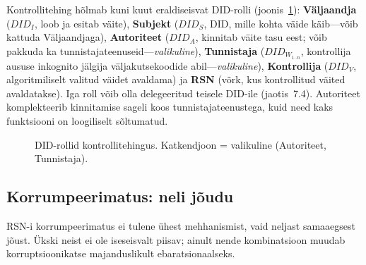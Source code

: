 \documentclass[11pt,a4paper,twocolumn]{article}
\begin{document}
Kontrollitehing hõlmab kuni kuut eraldiseisvat DID-rolli (joonis~\ref{fig:roles}): \textbf{Väljaandja} ($DID_I$, loob ja esitab väite), \textbf{Subjekt} ($DID_S$, DID, mille kohta väide käib---võib kattuda Väljaandjaga), \textbf{Autoriteet} ($DID_A$, kinnitab väite tasu eest; võib pakkuda ka tunnistajateenuseid---\emph{valikuline}), \textbf{Tunnistaja} ($DID_{W_{1..n}}$, kontrollija aususe inkognito jälgija väljakutsekoodide abil---\emph{valikuline}), \textbf{Kontrollija} ($DID_V$, algoritmiliselt valitud väidet avaldama) ja \textbf{RSN} (võrk, kus kontrollitud väited avaldatakse). Iga roll võib olla delegeeritud teisele DID-ile (jaotis~7.4). Autoriteet komplekteerib kinnitamise sageli koos tunnistajateenustega, kuid need kaks funktsiooni on loogiliselt sõltumatud.

\begin{figure}[ht]
\centering
{}
\caption{DID-rollid kontrollitehingus. Katkendjoon = valikuline (Autoriteet, Tunnistaja).}
\label{fig:roles}
\end{figure}

\subsection{Korrumpeerimatus: neli jõudu}

RSN-i korrumpeerimatus ei tulene ühest mehhanismist, vaid neljast samaaegsest jõust. Ükski neist ei ole iseseisvalt piisav; ainult nende kombinatsioon muudab korruptsioonikatse majanduslikult ebaratsionaalseks.
\end{document}
